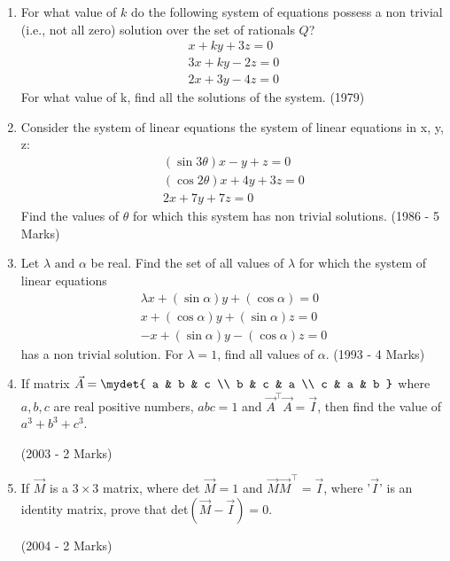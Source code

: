 \begin{enumerate}
\begin{enumerate}
	\end{enumerate}
\item For what value of $k$ do the following system of equations possess a non trivial (i.e., not all zero) solution over the set of rationals $Q$?\begin{align*}
x+ky+3z=0\\3x+ky-2z=0\\2x+3y-4z=0\end{align*} For what value of k, find all the solutions of the system. \hfill (1979)\\[2pt]
\item Consider the system of linear equations the system of linear equations in x, y, z:\begin{align*}(\sin 3\theta) x-y+z=0\\(\cos 2\theta)x+4y+3z=0\\2x+7y+7z=0\end{align*} Find the values of $\theta$ for which this system has non trivial solutions. \hfill (1986 - 5 Marks)\\[2pt]
\item Let $\lambda\text{ and }\alpha$ be real. Find the set of all values of $\lambda$ for which the system of linear equations \begin{align*}\lambda x+(\sin\alpha)y+(\cos\alpha)=0\\ x+(\cos\alpha)y+(\sin\alpha)z=0\\-x+(\sin\alpha)y-(\cos\alpha)z=0\end{align*} has a non trivial solution. For $\lambda = 1$, find all values of $\alpha$. \hfill (1993 - 4 Marks)\\[2pt]
	\item If matrix 
		$\vec{A} = \mydet{
			a & b & c \\
			b & c & a \\
			c & a & b } $
		where $a,b,c$ are real positive numbers, $abc=1$ and $\vec{A}^\top\vec{A}=\vec{I}$, then find the value of $a^3+b^3+c^3$.

		\hfill(2003 - 2 Marks)

	\item If $\vec{M}$ is a $3\times3$ matrix, where det $\vec{M}=1$ and $\vec{M}\vec{M}^\top=\vec{I}$, where '$\vec{I}$' is an identity matrix, prove that det$(\vec{M}-\vec{I})=0$.
		
		\hfill(2004 - 2 Marks)


\end{enumerate}

